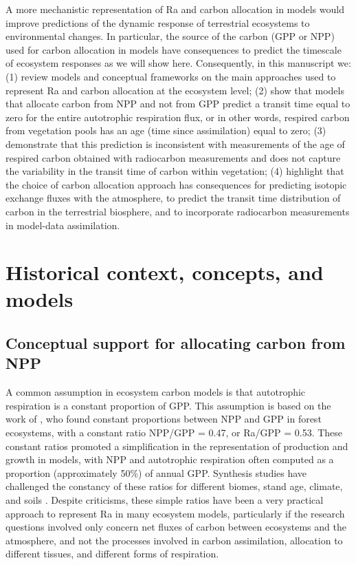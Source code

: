 \documentclass[12pt, a4paper]{article}
\begin{document}
A more mechanistic representation of Ra and carbon allocation in models would improve predictions of the dynamic response of terrestrial ecosystems to environmental changes. In particular, the source of the carbon (GPP or NPP) used for carbon allocation in models have consequences to predict the timescale of ecosystem responses as we will show here. 
Consequently, in this manuscript we: (1) review models and conceptual frameworks on the main approaches used to represent Ra and carbon allocation at the ecosystem level; (2) show that models that allocate carbon from NPP and not from GPP predict a transit time equal to zero for the entire autotrophic respiration flux, or in other words, respired carbon from vegetation pools has an age (time since assimilation) equal to zero; (3) demonstrate that this prediction is inconsistent with measurements of the age of respired carbon obtained with radiocarbon measurements and does not capture the variability in the transit time of carbon within vegetation; (4) highlight that the choice of carbon allocation approach has consequences for predicting isotopic exchange fluxes with the atmosphere, to predict the transit time distribution of carbon in the terrestrial biosphere, and to incorporate radiocarbon measurements in model-data assimilation. 

\section{Historical context, concepts, and models}
\subsection{Conceptual support for allocating carbon from NPP}
A common assumption in ecosystem carbon models is that autotrophic respiration is a constant proportion of GPP. This assumption is based on the work of \citet{Waring1998}, who found constant proportions between NPP and GPP in forest ecosystems, with a constant ratio NPP/GPP = 0.47, or Ra/GPP = 0.53. These constant ratios  promoted  a simplification in the representation of production and growth in models, with NPP and autotrophic respiration often computed as a proportion (approximately 50\%) of annual GPP. Synthesis studies have challenged the constancy of these ratios for different biomes, stand age, climate, and soils \citep{DeLucia2007, Collalti2019}. Despite criticisms, these simple ratios have been a very practical approach to represent Ra in many ecosystem models, particularly if the research questions involved only concern net fluxes of carbon between ecosystems and the atmosphere, and not the processes involved in carbon assimilation, allocation to different tissues, and different forms of respiration.
\end{document}
